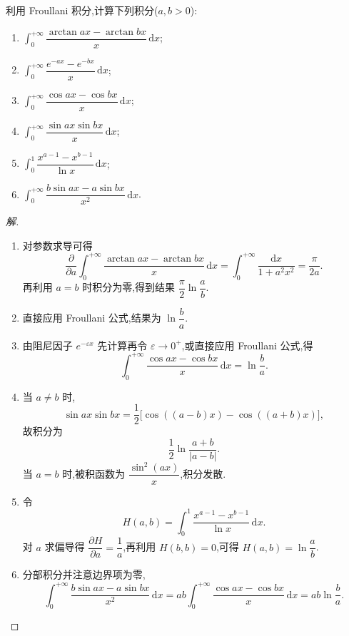 \documentclass[../../数学分析培优讲义(答案版).tex]{subfiles}
\begin{document}
\begin{example}
利用 Froullani 积分,计算下列积分($a,b>0$):
\begin{enumerate}[label=(\arabic*)]
    \item $\displaystyle\int_0^{+\infty}\dfrac{\arctan ax-\arctan bx}{x}\,\mathrm{d}x$;
    \item $\displaystyle\int_0^{+\infty}\dfrac{e^{-ax}-e^{-bx}}{x}\,\mathrm{d}x$;
    \item $\displaystyle\int_0^{+\infty}\dfrac{\cos ax-\cos bx}{x}\,\mathrm{d}x$;
    \item $\displaystyle\int_0^{+\infty}\dfrac{\sin ax\sin bx}{x}\,\mathrm{d}x$;
    \item $\displaystyle\int_0^1\dfrac{x^{a-1}-x^{b-1}}{\ln x}\,\mathrm{d}x$;
    \item $\displaystyle\int_0^{+\infty}\dfrac{b\sin ax-a\sin bx}{x^2}\,\mathrm{d}x$.
\end{enumerate}
\end{example}

\begin{proof}[解]
\begin{enumerate}[label=(\arabic*)]
    \item 对参数求导可得
    \[
        \dfrac{\partial}{\partial a}
        \int_0^{+\infty}\dfrac{\arctan ax-\arctan bx}{x}\,\mathrm{d}x
        =\int_0^{+\infty}\dfrac{\mathrm{d}x}{1+a^2x^2}=\dfrac{\pi}{2a}.
    \]
    再利用 $a=b$ 时积分为零,得到结果 $\dfrac{\pi}{2}\ln\dfrac{a}{b}$.

    \item 直接应用 Froullani 公式,结果为 $\ln\dfrac{b}{a}$.

    \item 由阻尼因子 $e^{-\varepsilon x}$ 先计算再令 $\varepsilon\to0^+$,或直接应用
    Froullani 公式,得
    \[
        \int_0^{+\infty}\dfrac{\cos ax-\cos bx}{x}\,\mathrm{d}x
        =\ln\dfrac{b}{a}.
    \]

    \item 当 $a\neq b$ 时,
    \[
        \sin ax\sin bx=\dfrac{1}{2}\bigl[\cos((a-b)x)-\cos((a+b)x)\bigr],
    \]
    故积分为
    \[
        \dfrac{1}{2}\ln\dfrac{a+b}{|a-b|}.
    \]
    当 $a=b$ 时,被积函数为 $\dfrac{\sin^2(ax)}{x}$,积分发散.

    \item 令
    \[
        H(a,b)=\int_0^1\dfrac{x^{a-1}-x^{b-1}}{\ln x}\,\mathrm{d}x.
    \]
    对 $a$ 求偏导得 $\dfrac{\partial H}{\partial a}=\dfrac{1}{a}$,再利用
    $H(b,b)=0$,可得 $H(a,b)=\ln\dfrac{a}{b}$.

    \item 分部积分并注意边界项为零,
    \[
        \int_0^{+\infty}\dfrac{b\sin ax-a\sin bx}{x^2}\,\mathrm{d}x
        =ab\int_0^{+\infty}\dfrac{\cos ax-\cos bx}{x}\,\mathrm{d}x
        =ab\ln\dfrac{b}{a}.
    \]
\end{enumerate}
\end{proof}
\end{document}
